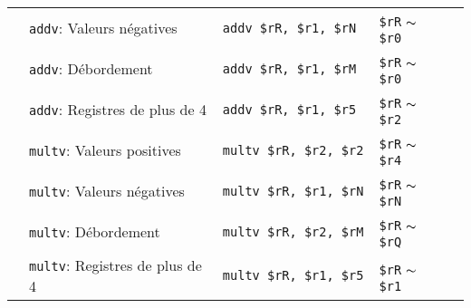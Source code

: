 \documentclass[a11paper]{article}
\newcommand{\cbox}{\fbox{\phantom{\ding{51}}}}
\newcounter{tid}
\newcommand{\tid}{\stepcounter{tid}\thetid}
\begin{document}
\begin{center}
\begin{longtable}{lp{5cm}p{4cm}p{4cm}l}
		\tid                               & \verb|addv|:
		Valeurs négatives                  &
		\verb|addv $rR, $r1, $rN|          &
		\verb|$rR| $\thicksim$ \verb|$r0|  &
		\cbox
		\\

		\tid                               & \verb|addv|:
		Débordement                        &
		\verb|addv $rR, $r1, $rM|          &
		\verb|$rR| $\thicksim$ \verb|$r0|  &
		\cbox
		\\

		\tid                               & \verb|addv|:
		Registres de plus de 4  &
		\verb|addv $rR, $r1, $r5|          &
		\verb|$rR| $\thicksim$ \verb|$r2|\footnotemark[2] &
		\cbox
		\\ %
		\tid                               & \verb|multv|:
		Valeurs positives                  &
		\verb|multv $rR, $r2, $r2 |        &
		\verb|$rR| $\thicksim$ \verb|$r4|  &
		\cbox
		\\

		\tid                               & \verb|multv|:
		Valeurs négatives                  &
		\verb|multv $rR, $r1, $rN|         &
		\verb|$rR| $\thicksim$ \verb|$rN|  &
		\cbox
		\\

		\tid                               & \verb|multv|:
		Débordement                        &
		\verb|multv $rR, $r2, $rM|         &
		\verb|$rR| $\thicksim$ \verb|$rQ|  &
		\cbox
		\\

		\tid                               & \verb|multv|:
		Registres de plus de 4             &
		\verb|multv $rR, $r1, $r5|         &
		\verb|$rR| $\thicksim$ \verb|$r1|\footnotemark[2]  &
		\cbox
		\\ %
	\end{longtable}
\end{center}

\end{document}
